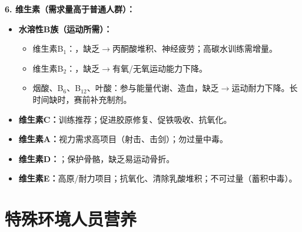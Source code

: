 \begin{defbox}
\textbf{6. 维生素（需求量高于普通人群）：}
\begin{itemize}[leftmargin=*]
    \item \textbf{水溶性B族（运动所需）：}
    \begin{itemize}
        \item 维生素B$_{1}$：，缺乏$\rightarrow$丙酮酸堆积、神经疲劳；高碳水训练需增量。
        \item 维生素B$_{2}$：，缺乏$\rightarrow$有氧/无氧运动能力下降。
        \item 烟酸、B$_{6}$、B$_{12}$、叶酸：参与能量代谢、造血，缺乏$\rightarrow$运动耐力下降。长时间缺时，赛前补充制剂。
    \end{itemize}
    \item \textbf{维生素C：}训练推荐；促进胶原修复、促铁吸收、抗氧化。
    \item \textbf{维生素A：}视力需求高项目（射击、击剑）；勿过量中毒。
    \item \textbf{维生素D：}；保护骨骼，缺乏易运动骨折。
    \item \textbf{维生素E：}高原/耐力项目；抗氧化、清除乳酸堆积；不可过量（蓄积中毒）。
\end{itemize}
\end{defbox}

\section{特殊环境人员营养}

